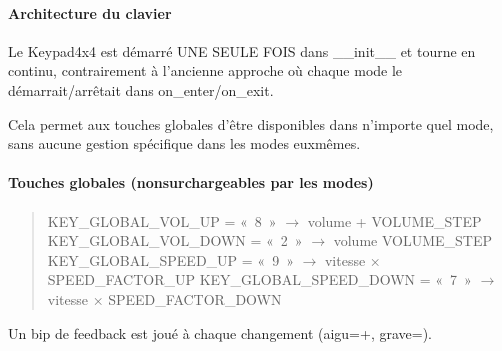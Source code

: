 \documentclass[letterpaper,10pt,french]{sphinxmanual}
\begin{document}
\paragraph{Architecture du clavier}
\label{\detokenize{api/core:architecture-du-clavier}}
\sphinxAtStartPar
Le Keypad4x4 est démarré UNE SEULE FOIS dans \_\_init\_\_ et tourne
en continu, contrairement à l’ancienne approche où chaque mode
le démarrait/arrêtait dans on\_enter/on\_exit.

\sphinxAtStartPar
Cela permet aux touches globales d’être disponibles dans n’importe
quel mode, sans aucune gestion spécifique dans les modes eux\sphinxhyphen{}mêmes.


\paragraph{Touches globales (non\sphinxhyphen{}surchargeables par les modes)}
\label{\detokenize{api/core:touches-globales-non-surchargeables-par-les-modes}}\begin{quote}

\sphinxAtStartPar
KEY\_GLOBAL\_VOL\_UP   = « 8 »   \(\rightarrow\) volume + VOLUME\_STEP
KEY\_GLOBAL\_VOL\_DOWN = « 2 »   \(\rightarrow\) volume \sphinxhyphen{} VOLUME\_STEP
KEY\_GLOBAL\_SPEED\_UP = « 9 »   \(\rightarrow\) vitesse × SPEED\_FACTOR\_UP
KEY\_GLOBAL\_SPEED\_DOWN = « 7 » \(\rightarrow\) vitesse × SPEED\_FACTOR\_DOWN
\end{quote}

\sphinxAtStartPar
Un bip de feedback est joué à chaque changement (aigu=+, grave=\sphinxhyphen{}).
\end{document}
